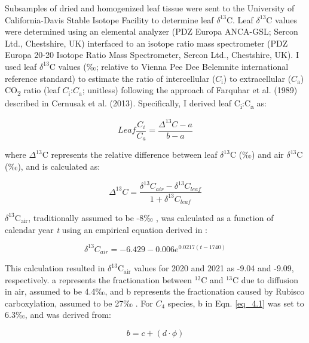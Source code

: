 Subsamples of dried and homogenized leaf tissue were sent to the University of California-Davis Stable Isotope Facility to determine leaf $\delta^{13}$C. Leaf $\delta^{13}$C values were determined using an elemental analyzer (PDZ Europa ANCA-GSL; Sercon Ltd., Chestshire, UK) interfaced to an isotope ratio mass spectrometer (PDZ Europa 20-20 Isotope Ratio Mass Spectrometer, Sercon Ltd., Chestshire, UK). I used leaf $\delta^{13}$C values (‰; relative to Vienna Pee Dee Belemnite international reference standard) to estimate the ratio of intercellular ($C_\mathrm{i}$) to extracellular ($C_\mathrm{a}$) CO\textsubscript{2} ratio (leaf $C_\mathrm{i}$:$C_\mathrm{a}$; unitless) following the approach of Farquhar et al. (1989) described in Cernusak et al. (2013). Specifically, I derived leaf C\textsubscript{i}:C\textsubscript{a} as:

\begin{equation} 
    \label{eq_4.1}
    Leaf \frac{C_{i}}{C_{a}}=\frac{\Delta^{13}C - a}{b - a}
\end{equation}
    
\noindent where $\Delta^{13}$C represents the relative difference between leaf $\delta^{13}$C (‰) and air $\delta^{13}$C (‰), and is calculated as:

\begin{equation}
    \label{eq_4.2}
    \Delta^{13}C = \frac{\delta^{13}C_{air} - \delta^{13}C_{leaf}}{1 + \delta^{13}C_{leaf}}
\end{equation}

\noindent $\delta^{13}\mathrm{C_{air}}$, traditionally assumed to be -8‰ , was calculated as a function of calendar year \textit{t} using an empirical equation derived in :

\begin{equation}
    \label{eq_4.3}
    \delta^{13}C_{air} = -6.429 - 0.006e^{0.0217(t-1740)}
\end{equation}
    
 \noindent This calculation resulted in $\delta^{13}\mathrm{C_{air}}$ values for 2020 and 2021 as -9.04 and -9.09, respectively. a represents the fractionation between $^{12}\mathrm{C}$ and $^{13}\mathrm{C}$ due to diffusion in air, assumed to be 4.4‰, and b represents the fractionation caused by Rubisco carboxylation, assumed to be 27‰ . For $C_{4}$ species, b in Eqn. \ref{eq_4.1} was set to 6.3‰, and was derived from:

\begin{equation}
    \label{eq_4.4}
    b = c + (d \cdot \phi)
\end{equation}
    
